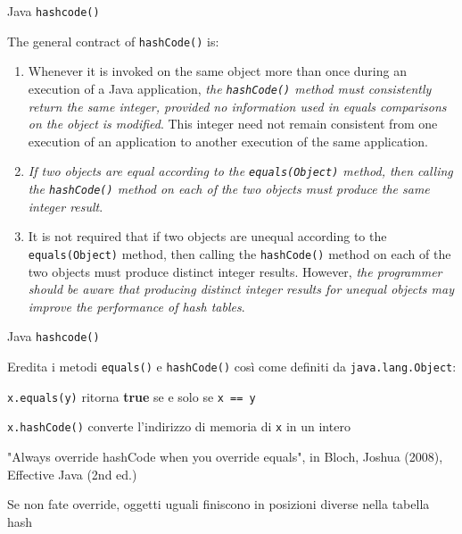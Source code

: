 \begin{frame}[shrink=10]{Java \texttt{hashcode()}}
	
\vspace{-9pt}
\begin{myboxtitle}
The general contract of \texttt{hashCode()} is:
\begin{enumerate}
\item Whenever it is invoked on the same object more than once during an
execution of a Java application, \alert{\emph{the \texttt{hashCode()} method must consistently return
the same integer, provided no information used in equals comparisons on the
object is modified}}. This integer need not remain consistent from one execution
of an application to another execution of the same application.
\item \alert{\emph{If two objects are equal according to the \texttt{equals(Object)} method, then
calling the \texttt{hashCode()} method on each of the two objects must produce the same
integer result}}.
\item It is not required that if two objects are unequal according to the
\texttt{equals(Object)} method, then calling the \texttt{hashCode()} method on each of
the two objects must produce distinct integer results. However, \alert{\emph{the programmer
should be aware that producing distinct integer results for unequal objects may
improve the performance of hash tables}}.
\end{enumerate}
\end{myboxtitle}

\end{frame}


\begin{frame}{Java \texttt{hashcode()}}

\vspace{-9pt}
\BIL
\item Eredita i metodi
\texttt{equals()} e \texttt{hashCode()} così come definiti da \texttt{java.lang.Object}:
\BI
\item \texttt{x.equals(y)}  ritorna \textbf{true} se e solo se \texttt{x == y}
\item \texttt{x.hashCode()} converte l'indirizzo di memoria di \texttt{x} in un intero
\EI
\EIL

\BIL
\item "Always override hashCode when you override equals", in Bloch, Joshua (2008), Effective Java (2nd ed.)
\item Se non fate override, oggetti uguali finiscono in posizioni diverse
nella tabella hash
\EIL

\end{frame}

